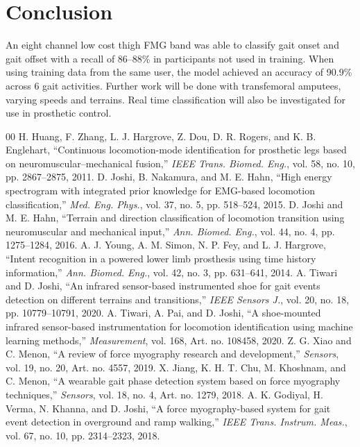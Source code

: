\documentclass[conference]{IEEEtran}
\begin{document}
\section{Conclusion}
An eight channel low cost thigh FMG band was able to classify gait onset and gait offset with a recall of 86--88\% in participants not used in training. When using training data from the same user, the model achieved an accuracy of 90.9\% across 6 gait activities. Further work will be done with transfemoral amputees, varying speeds and terrains. Real time classification will also be investigated for use in prosthetic control.

\begin{thebibliography}{00}
 H. Huang, F. Zhang, L. J. Hargrove, Z. Dou, D. R. Rogers, and K. B. Englehart, ``Continuous locomotion-mode identification for prosthetic legs based on neuromuscular--mechanical fusion,'' \emph{IEEE Trans. Biomed. Eng.}, vol. 58, no. 10, pp. 2867--2875, 2011.
 D. Joshi, B. Nakamura, and M. E. Hahn, ``High energy spectrogram with integrated prior knowledge for EMG-based locomotion classification,'' \emph{Med. Eng. Phys.}, vol. 37, no. 5, pp. 518--524, 2015.
 D. Joshi and M. E. Hahn, ``Terrain and direction classification of locomotion transition using neuromuscular and mechanical input,'' \emph{Ann. Biomed. Eng.}, vol. 44, no. 4, pp. 1275--1284, 2016.
 A. J. Young, A. M. Simon, N. P. Fey, and L. J. Hargrove, ``Intent recognition in a powered lower limb prosthesis using time history information,'' \emph{Ann. Biomed. Eng.}, vol. 42, no. 3, pp. 631--641, 2014.
 A. Tiwari and D. Joshi, ``An infrared sensor-based instrumented shoe for gait events detection on different terrains and transitions,'' \emph{IEEE Sensors J.}, vol. 20, no. 18, pp. 10779--10791, 2020.
 A. Tiwari, A. Pai, and D. Joshi, ``A shoe-mounted infrared sensor-based instrumentation for locomotion identification using machine learning methods,'' \emph{Measurement}, vol. 168, Art. no. 108458, 2020.
 Z. G. Xiao and C. Menon, ``A review of force myography research and development,'' \emph{Sensors}, vol. 19, no. 20, Art. no. 4557, 2019.
 X. Jiang, K. H. T. Chu, M. Khoshnam, and C. Menon, ``A wearable gait phase detection system based on force myography techniques,'' \emph{Sensors}, vol. 18, no. 4, Art. no. 1279, 2018.
 A. K. Godiyal, H. Verma, N. Khanna, and D. Joshi, ``A force myography-based system for gait event detection in overground and ramp walking,'' \emph{IEEE Trans. Instrum. Meas.}, vol. 67, no. 10, pp. 2314--2323, 2018.

\end{thebibliography}
\end{document}
